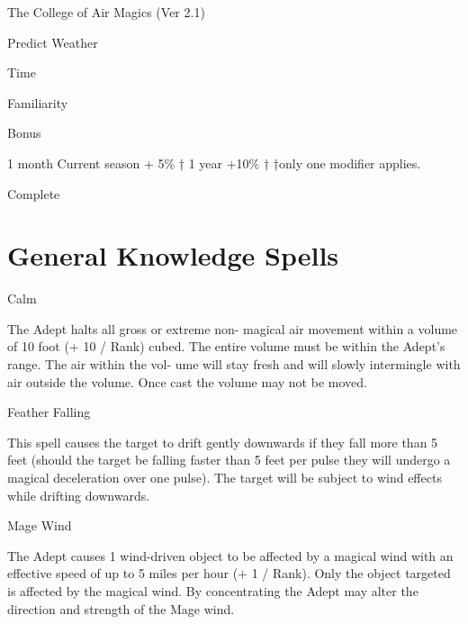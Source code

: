 \begin{Chapter}{The College of Air Magics (Ver 2.1)}
\begin{talent}[T-3]{Predict Weather }
\begin{effects}
Time 

Familiarity 

Bonus 

1 month  Current season  + 5\% † 
1 year 
+10\% † 
†only one modifier applies. 

Complete 


\end{effects}
\end{talent}

\section{General Knowledge Spells}

\begin{spell}[G-1]{Calm }

\begin{effects}
 The  Adept  halts  all  gross or  extreme  non-
magical  air  movement  within  a  volume  of  10  foot 
(+  10  /  Rank)  cubed.  The  entire  volume  must  be 
within  the  Adept’s  range.  The  air  within  the  vol-
ume  will  stay  fresh  and  will  slowly  intermingle 
with air outside the volume. Once cast the volume 
may not be moved. 

\end{effects}
\end{spell}

\begin{spell}[G-2]{Feather Falling }

\begin{effects}
 This  spell  causes  the  target  to  drift  gently 
downwards if they fall more than 5 feet (should the 
target  be  falling  faster  than  5  feet  per  pulse  they 
will  undergo  a  magical  deceleration  over  one 
pulse).  The  target  will  be  subject  to  wind  effects 
while drifting downwards. 

\end{effects}
\end{spell}

\begin{spell}[G-3]{Mage Wind }

\begin{effects}
 The  Adept  causes  1  wind-driven  object to 
be  affected  by  a  magical  wind  with  an  effective 
speed of up to 5 miles per hour (+ 1 / Rank). Only 
the object targeted is affected by the magical wind. 
By concentrating the Adept may alter the direction 
and strength of the Mage wind. 


\end{effects}
\end{spell}
\end{Chapter}
